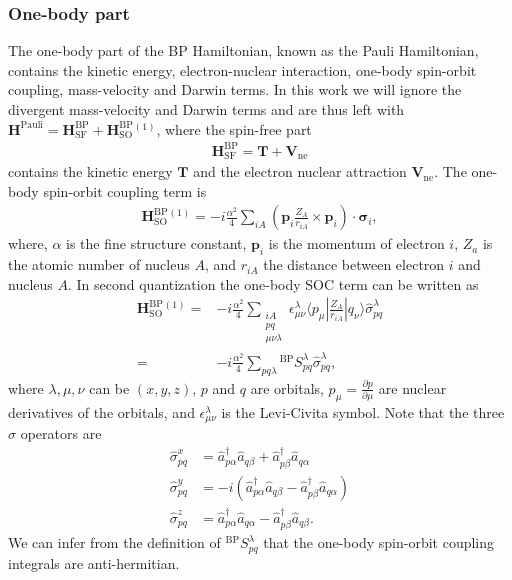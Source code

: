 \documentclass[10pt,aps,prb,twocolumn,amsmath,amssymb,superscriptaddress]{revtex4-1}
\renewcommand\b[1]{\ensuremath{\mathbf{#1}}}
\newcommand\B[1]  {\ensuremath{\pmb #1}}
\begin{document}
\subsubsection{One-body part}
The one-body part of the BP Hamiltonian, known as the Pauli Hamiltonian, contains the kinetic energy, electron-nuclear interaction, one-body spin-orbit coupling, mass-velocity and Darwin terms. In this work we will ignore the divergent mass-velocity and Darwin terms and are thus left with $\b{H}^\text{Pauli}=\b{H}^\text{BP}_\text{SF}+\b{H}^\text{BP}_\text{SO}{}^{(1)}$, where the spin-free part
\begin{align}
\b{H}^\text{BP}_\text{SF}=\b{T} + \b{V}_\text{ne}
\label{eq:BPsf}
\end{align}
contains the kinetic energy
$\b{T}$ and the electron nuclear attraction $\b{V}_\text{ne}$. The one-body spin-orbit coupling term is
\begin{align}
    \b{H}^\text{BP}_\text{SO}{}^{(1)}=-i\frac{\alpha^2}{4} \sum_{iA} \left(\b{p}_i\frac{Z_{A}}{r_{iA}}\times \b{p}_i\right)\cdot  \B{\sigma}_i
\label{eq:BPso1}
,\end{align}
where,
$\alpha$ is the fine structure constant,
$\b{p}_i$ is the momentum of electron $i$,
$Z_{a}$ is the atomic number of nucleus $A$,
and $r_{iA}$ the distance between electron $i$ and nucleus $A$.
In second quantization the one-body SOC term can be written as
\begin{align}
    \b{H}^\text{BP}_\text{SO}{}^{(1)}=&-i\frac{\alpha^2}{4}\sum_{\substack{iA\\pq\\\mu\nu\lambda}} \epsilon_{\mu\nu}^\lambda \langle p_\mu|\frac{Z_{A}}{r_{iA}} | q_\nu\rangle\hat{\sigma}_{pq}^\lambda\\
    =&-i\frac{\alpha^2}{4}\sum_{pq\lambda} {}^\text{BP}\!S_{pq}^\lambda\hat{\sigma}_{pq}^\lambda
    \label{eq:Sbp}
,\end{align}
where
$\lambda,\mu,\nu$ can be $(x,y,z)$,
$p$ and $q$ are orbitals,
$p_\mu  = \frac{\partial p}{\partial \mu}$ are nuclear derivatives of the orbitals,
and $\epsilon_{\mu\nu}^\lambda$ is the Levi-Civita symbol.
Note that the three $\hat{\sigma}$ operators are
\begin{align}
    \hat{\sigma}_{pq}^x &=   \hat{a}_{p\alpha}^\dag \hat{a}_{q\beta}  + \hat{a}_{p\beta}^\dag \hat{a}_{q\alpha} \nonumber\\
    \hat{\sigma}_{pq}^y &=-i(\hat{a}_{p\alpha}^\dag \hat{a}_{q\beta}  - \hat{a}_{p\beta}^\dag \hat{a}_{q\alpha})\\
    \hat{\sigma}_{pq}^z &=   \hat{a}_{p\alpha}^\dag \hat{a}_{q\alpha} - \hat{a}_{p\beta}^\dag \hat{a}_{q\beta}\nonumber
.\end{align}
We can infer from the definition of ${}^\text{BP}\!S_{pq}^\lambda$ that the one-body spin-orbit coupling integrals are anti-hermitian.
\end{document}

